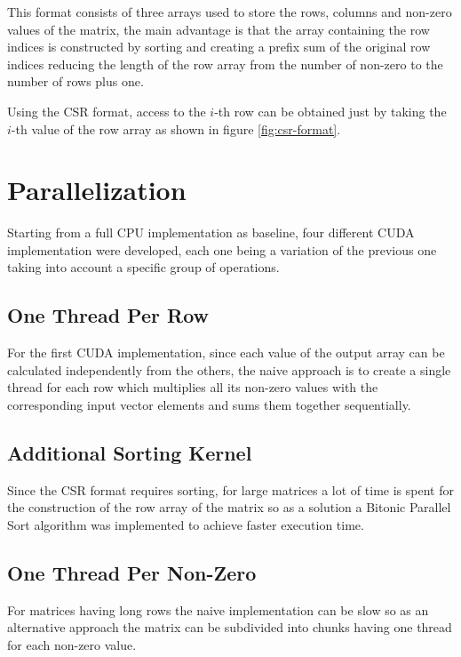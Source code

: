 \documentclass[conference]{IEEEtran}
\begin{document}
    This format consists of three arrays used to store the rows, columns and
    non-zero values of the matrix, the main advantage is that the array
    containing the row indices is constructed by sorting and creating a prefix
    sum of the original row indices reducing the length of the row array from
    the number of non-zero to the number of rows plus one.

    Using the CSR format, access to the $i$-th row can be obtained just by
    taking the $i$-th value of the row array as shown in figure
    \ref{fig:csr-format}.

    \section{Parallelization}

    Starting from a full CPU implementation as baseline, four different CUDA
    implementation were developed, each one being a variation of the previous
    one taking into account a specific group of operations.

    \subsection{One Thread Per Row}

    For the first CUDA implementation, since each value of the output array can
    be calculated independently from the others, the naive approach is to
    create a single thread for each row which multiplies all its non-zero
    values with the corresponding input vector elements and sums them together
    sequentially.

    \subsection{Additional Sorting Kernel}

    Since the CSR format requires sorting, for large matrices a lot of time is
    spent for the construction of the row array of the matrix so as a solution
    a Bitonic Parallel Sort algorithm was implemented to achieve faster
    execution time.

    \subsection{One Thread Per Non-Zero}

    For matrices having long rows the naive implementation can be slow so as an
    alternative approach the matrix can be subdivided into chunks having one
    thread for each non-zero value.
\end{document}
